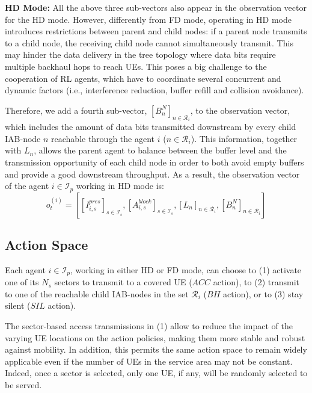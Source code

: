 \textbf{HD Mode:}
All the above three sub-vectors also appear in the observation vector for the HD mode. However, differently from FD mode, operating in HD mode introduces restrictions between parent and child nodes: if a parent node transmits to a child node, the receiving child node cannot simultaneously transmit. This may hinder the data delivery in the tree topology where data bits require multiple backhaul hops to reach UEs. This poses a big challenge to the cooperation of RL agents, which have to coordinate several concurrent and dynamic factors (i.e., interference reduction, buffer refill and collision avoidance).

Therefore, we add a fourth sub-vector, $[B^N_{n}]_{n \in \mathcal{R}_i}$, to the observation vector, which includes the amount of data bits transmitted downstream by every child IAB-node $n$ reachable through the agent $i$ ($n \in \mathcal{R}_i$). This information, together with $L_n$, allows the parent agent to balance between the buffer level and the transmission opportunity of each child node in order to both avoid empty buffers and provide a good downstream throughput. As a result, the observation vector of the agent $i\in\mathcal{I}_p$ working in HD mode is:
\begin{equation}
	o^{(i)}_t = {[[I^{pres}_{i, s}]_{s \in \mathcal{I}_s}, [A^{block}_{i, s}]_{s \in \mathcal{I}_s}, [L_n]_{n \in \mathcal{R}_i}, [B^N_n]_{n \in \mathcal{R}_i}]}
	\label{observation}
\end{equation}

\vspace{-15pt}
\subsection{Action Space}

Each agent $i \in \mathcal{I}_p$, working in either HD or FD mode, can choose to (1) activate one of its $N_s$ sectors to transmit to a covered UE ($ACC$ action), to (2) transmit to one of the reachable child IAB-nodes in the set $\mathcal{R}_i$ ($BH$ action), or to (3) stay silent ($SIL$ action).

The sector-based access transmissions in (1) allow to reduce the impact of the varying UE locations on the action policies, making them more stable and robust against mobility. In addition, this permits the same action space to remain widely applicable even if the number of UEs in the service area may not be constant. Indeed, once a sector is selected, only one UE, if any, will be randomly selected to be served.

